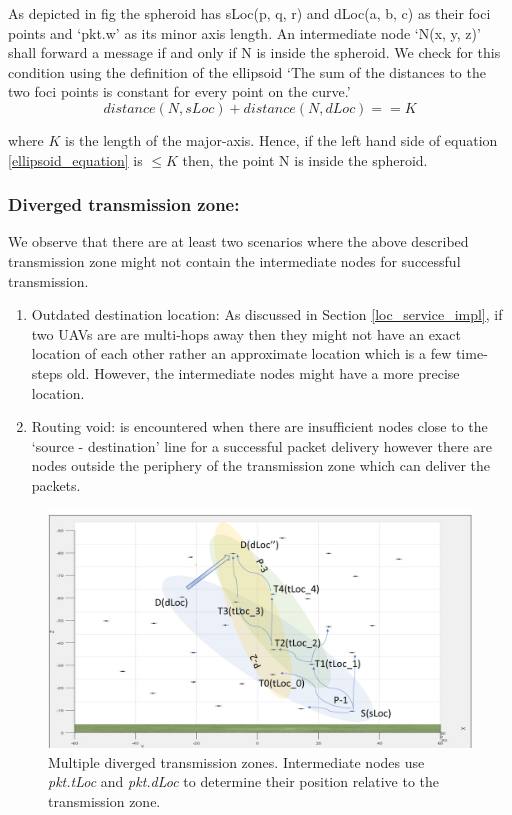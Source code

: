 As depicted in fig  the spheroid has sLoc(p, q, r) and dLoc(a, b, c) as their foci points and `pkt.w' as its minor axis length. An intermediate node `N(x, y, z)' shall forward a message if and only if N is inside the spheroid. We check for this condition using the definition of the ellipsoid `The sum of the distances to the two foci points is constant for every point on the curve.'
\begin{equation} \label{ellipsoid_equation}
    distance(N, sLoc) + distance(N, dLoc) == K
\end{equation}

where $K$ is the length of the major-axis. Hence, if the left hand side of equation \ref{ellipsoid_equation} is $\leq K$ then, the point N is inside the spheroid.

\subsubsection{Diverged transmission zone:}
\label{diverged_trans_zone}
We observe that there are at least two scenarios where the above described transmission zone might not contain the intermediate nodes for successful transmission. 
\begin{enumerate}
    \item Outdated destination location: As discussed in Section \ref{loc_service_impl}, if two UAVs are are multi-hops away then they might not have an exact location of each other rather an approximate location which is a few time-steps old. However, the intermediate nodes might have a more precise location.
    
    \item Routing void: is encountered when there are insufficient nodes close to the `source - destination' line for a successful packet delivery however there are nodes outside the periphery of the transmission zone which can deliver the packets.  
\end{enumerate}

\begin{figure}[hbtp]
    \centering
    \includegraphics[width=1\textwidth]{Chapter-4/figs/diverge_zone}
    \caption{Multiple diverged transmission zones. Intermediate nodes use \emph{pkt.tLoc} and \emph{pkt.dLoc} to determine their position relative to the transmission zone.}
    \label{fig:diverged_transmission_zone}
\end{figure}

